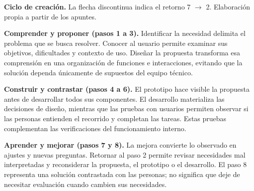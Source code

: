 \begin{center}

{\small\textbf{Ciclo de creación.} La flecha discontinua indica el retorno
7 $\rightarrow$ 2. Elaboración propia a partir de los apuntes.\par}
\end{center}

\textbf{Comprender y proponer (pasos 1 a 3).} Identificar la necesidad delimita
el problema que se busca resolver. Conocer al usuario permite examinar sus
objetivos, dificultades y contexto de uso. Diseñar la propuesta transforma
esa comprensión en una organización de funciones e interacciones, evitando
que la solución dependa únicamente de supuestos del equipo técnico.

\textbf{Construir y contrastar (pasos 4 a 6).} El prototipo hace visible la
propuesta antes de desarrollar todos sus componentes. El desarrollo materializa
las decisiones de diseño, mientras que las pruebas con usuarios permiten
observar si las personas entienden el recorrido y completan las tareas.
Estas pruebas complementan las verificaciones del funcionamiento interno.

\textbf{Aprender y mejorar (pasos 7 y 8).} La mejora convierte lo observado
en ajustes y nuevas preguntas. Retornar al paso 2 permite revisar necesidades
mal interpretadas y reconsiderar la propuesta, el prototipo o el desarrollo.
El paso 8 representa una solución contrastada con las personas; no significa
que deje de necesitar evaluación cuando cambien sus necesidades.

